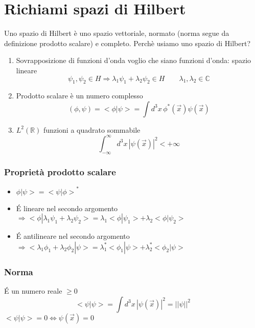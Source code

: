 \documentclass[a4paper,11pt]{report}
\theoremstyle{remark}
\theoremstyle{definition}
\newcommand{\C}{\mathbb{C}}
\newcommand{\R}{\mathbb{R}}
\begin{document}
\chapter{Richiami spazi di Hilbert}

Uno spazio di Hilbert è uno spazio vettoriale, normato (norma segue da definizione prodotto scalare) e completo. Perchè usiamo uno spazio di Hilbert?
\begin{enumerate}
    \item Sovrapposizione di funzioni d'onda voglio che siano funzioni d'onda: spazio lineare
    \begin{equation*}
        \psi_1,\psi_2 \in H \Rightarrow \lambda_1\psi_1 + \lambda_2\psi_2 \in H \qquad \lambda_1,\lambda_2 \in \C 
    \end{equation*}
    \item Prodotto scalare è un numero complesso
    \begin{equation*}
        (\phi,\psi) = <\phi | \psi> = \int d^3x \, \phi^*(\vec{x})\psi(\vec{x})
    \end{equation*}
    \item $L^2(\R)$ funzioni a quadrato sommabile
    \begin{equation*}
        \int_{-\infty}^\infty d^3x \, {|\psi(\vec{x})|}^2 < +\infty
    \end{equation*}
\end{enumerate}

\subsection*{Proprietà prodotto scalare}

\begin{itemize}
    \item $\phi | \psi > = {<\psi | \phi >}^*$
    \item \'E lineare nel secondo argomento $\Rightarrow <\phi | \lambda_1\psi_1 + \lambda_2\psi_2> = \lambda_1 <\phi | \psi_1 > + \lambda_2 < \phi | \psi_2 >$
    \item \'E antilineare nel secondo argomento $\Rightarrow <\lambda_1 \phi_1 + \lambda_2 \phi_2 | \psi> = \lambda_1^*<\phi_1 | \psi> + \lambda_2^* <\phi_2 |\psi> $
\end{itemize}

\subsection*{Norma}
\'E un numero reale $\ge 0$ 
\begin{equation*}
    <\psi | \psi > = \int d^3x \, {|\psi(\vec{x})|}^2 = {||\psi||}^2 
\end{equation*}
$<\psi | \psi > = 0 \iff \psi(\vec{x})=0$
\end{document}
